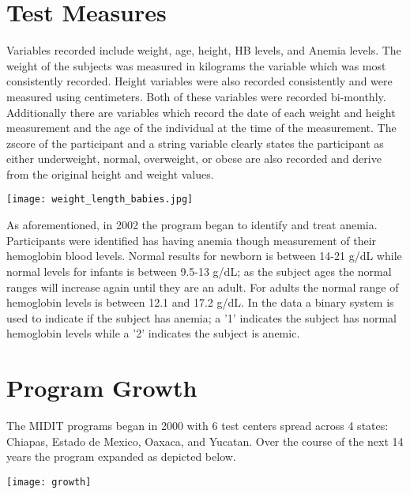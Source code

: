 \documentclass{article}
\begin{document}
\section{Test Measures}
Variables recorded include weight, age, height, HB levels, and Anemia levels. The weight of the subjects was measured in kilograms the variable which was most consistently recorded. Height variables were also recorded consistently and were measured using centimeters. Both of these variables were recorded bi-monthly. Additionally there are variables which record the date of each weight and height measurement and the age of the individual at the time of the measurement. The zscore of the participant and a string variable clearly states the participant as either underweight, normal, overweight, or obese are also recorded and derive from the original height and weight values.

\begin{center}
\texttt{[image: weight\_length\_babies.jpg]}
\end{center}

As aforementioned, in 2002 the program began to identify and treat anemia. Participants were identified has having anemia though measurement of their hemoglobin blood levels. Normal results for newborn is between 14-21 g/dL while normal levels for infants is between 9.5-13 g/dL; as the subject ages the normal ranges will increase again until they are an adult. For adults the normal range of hemoglobin levels is between 12.1 and 17.2 g/dL. In the data a binary system is used to indicate if the subject has anemia; a '1' indicates the subject has normal hemoglobin levels while a '2' indicates the subject is anemic. 

\section{Program Growth}
The MIDIT programs began in 2000 with 6 test centers spread across 4 states: Chiapas, Estado de Mexico, Oaxaca, and Yucatan. Over the course of the next 14 years the program expanded as depicted below.
\begin{center}
\texttt{[image: growth]}
\end{center}



\end{document}
